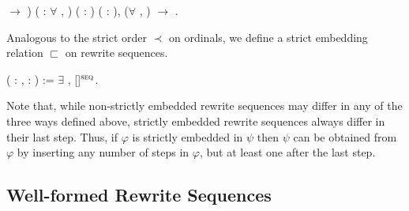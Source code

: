 \begin{singlespace}
\begin{coqdoccode}
\ensuremath{\rightarrow} )
( : \ensuremath{\forall} ,
 )\coqdoceol
\coqdocindent{5.00em}
( :
 
) (\coqdocvar{$\psi$} : 
),\coqdoceol
\coqdocindent{9.50em}
(\ensuremath{\forall} ,  
 \coqdocvariable{$\psi$})
\ensuremath{\rightarrow}\coqdoceol
\coqdocindent{9.50em}
 
 
\coqdocvariable{$\psi$}.\coqdoceol
\end{coqdoccode}
\end{singlespace}

Analogous to the strict order $\prec$ on ordinals, we define a strict
embedding relation $\sqsubset$ on rewrite sequences.
\begin{singlespace}
\begin{coqdoccode}
\coqdocnoindent
{}
   
(\coqdocvar{$\varphi$} : 
,
\coqdocvar{$\psi$} :
) := \ensuremath{\exists} \coqdocvar{$\iota$},
\coqdocvariable{$\varphi$} 
\coqdocvariable{$\psi$}[\coqdocvariable{$\iota$}]$^\textsc{seq}$.\coqdoceol
\end{coqdoccode}
\end{singlespace}
Note that, while non-strictly embedded rewrite sequences may differ in
any of the three ways defined above, strictly embedded rewrite
sequences always differ in their last step. Thus, if $\varphi$ is
strictly embedded in $\psi$ then $\psi$ can be obtained from $\varphi$
by inserting any number of steps in $\varphi$, but at least one after
the last step.


\subsection{Well-formed Rewrite Sequences}\label{sub:wf}

